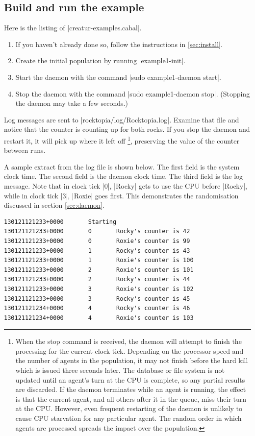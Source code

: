 \documentclass[a4paper,10pt]{report}
\begin{document}
\begin{itemize}


\section{Build and run the example}
\label{sec:run1}


Here is the listing of |creatur-examples.cabal|.


\begin{enumerate}
\item If you haven't already done so, follow the instructions in 
\ref{sec:install}.
\item Create the initial population by running |example1-init|.
\item Start the daemon with the command |sudo example1-daemon start|.
\item Stop the daemon with the command |sudo example1-daemon stop|.
(Stopping the daemon may take a few seconds.)
\end{enumerate}

Log messages are sent to |rocktopia/log/Rocktopia.log|.
Examine that file and notice that the counter is counting up for both rocks.
If you stop the daemon and restart it, it will pick up where it left off
\footnote{When the stop command is received, the daemon will attempt
to finish the processing for the current clock tick.
Depending on the processor speed and the number of agents in the population,
it may not finish before the hard kill which is issued three seconds later.
The database or file system is not updated until an agent's turn at the CPU 
is complete, so any partial results are discarded.
If the daemon terminates while an agent is running,
the effect is that the current agent, and all others after it in the queue,
miss their turn at the CPU.
However, even frequent restarting of the daemon
is unlikely to cause CPU starvation for any particular agent.
The random order in which agents are processed spreads the impact
over the population.}, preserving the value of the 
counter between runs.

A sample extract from the log file is shown below.
The first field is the system clock time.
The second field is the daemon clock time.
The third field is the log message.
Note that in clock tick |0|, |Rocky| gets to use the CPU before |Rocky|,
while in clock tick |3|, |Roxie| goes first.
This demonstrates the randomisation discussed in section \ref{sec:daemon}.

\begin{verbatim}
130121121233+0000       Starting
130121121233+0000       0       Rocky's counter is 42
130121121233+0000       0       Roxie's counter is 99
130121121233+0000       1       Rocky's counter is 43
130121121233+0000       1       Roxie's counter is 100
130121121233+0000       2       Roxie's counter is 101
130121121233+0000       2       Rocky's counter is 44
130121121233+0000       3       Roxie's counter is 102
130121121233+0000       3       Rocky's counter is 45
130121121234+0000       4       Rocky's counter is 46
130121121234+0000       4       Roxie's counter is 103
\end{verbatim}


\end{itemize}
\end{document}

